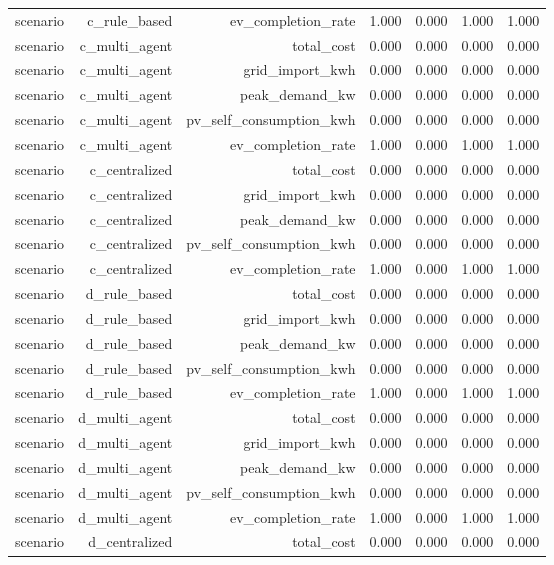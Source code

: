 \begin{tabular}{lrrrrrr}
scenario & c_rule_based & ev_completion_rate & 1.000 & 0.000 & 1.000 & 1.000 \\
scenario & c_multi_agent & total_cost & 0.000 & 0.000 & 0.000 & 0.000 \\
scenario & c_multi_agent & grid_import_kwh & 0.000 & 0.000 & 0.000 & 0.000 \\
scenario & c_multi_agent & peak_demand_kw & 0.000 & 0.000 & 0.000 & 0.000 \\
scenario & c_multi_agent & pv_self_consumption_kwh & 0.000 & 0.000 & 0.000 & 0.000 \\
scenario & c_multi_agent & ev_completion_rate & 1.000 & 0.000 & 1.000 & 1.000 \\
scenario & c_centralized & total_cost & 0.000 & 0.000 & 0.000 & 0.000 \\
scenario & c_centralized & grid_import_kwh & 0.000 & 0.000 & 0.000 & 0.000 \\
scenario & c_centralized & peak_demand_kw & 0.000 & 0.000 & 0.000 & 0.000 \\
scenario & c_centralized & pv_self_consumption_kwh & 0.000 & 0.000 & 0.000 & 0.000 \\
scenario & c_centralized & ev_completion_rate & 1.000 & 0.000 & 1.000 & 1.000 \\
scenario & d_rule_based & total_cost & 0.000 & 0.000 & 0.000 & 0.000 \\
scenario & d_rule_based & grid_import_kwh & 0.000 & 0.000 & 0.000 & 0.000 \\
scenario & d_rule_based & peak_demand_kw & 0.000 & 0.000 & 0.000 & 0.000 \\
scenario & d_rule_based & pv_self_consumption_kwh & 0.000 & 0.000 & 0.000 & 0.000 \\
scenario & d_rule_based & ev_completion_rate & 1.000 & 0.000 & 1.000 & 1.000 \\
scenario & d_multi_agent & total_cost & 0.000 & 0.000 & 0.000 & 0.000 \\
scenario & d_multi_agent & grid_import_kwh & 0.000 & 0.000 & 0.000 & 0.000 \\
scenario & d_multi_agent & peak_demand_kw & 0.000 & 0.000 & 0.000 & 0.000 \\
scenario & d_multi_agent & pv_self_consumption_kwh & 0.000 & 0.000 & 0.000 & 0.000 \\
scenario & d_multi_agent & ev_completion_rate & 1.000 & 0.000 & 1.000 & 1.000 \\
scenario & d_centralized & total_cost & 0.000 & 0.000 & 0.000 & 0.000 \\

\end{tabular}

